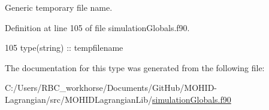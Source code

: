 Generic temporary file name. 



Definition at line 105 of file simulation\+Globals.\+f90.


\begin{DoxyCode}
105         \textcolor{keywordtype}{type}(string) :: tempfilename
\end{DoxyCode}


The documentation for this type was generated from the following file\+:\begin{DoxyCompactItemize}
\item 
C\+:/\+Users/\+R\+B\+C\+\_\+workhorse/\+Documents/\+Git\+Hub/\+M\+O\+H\+I\+D-\/\+Lagrangian/src/\+M\+O\+H\+I\+D\+Lagrangian\+Lib/\mbox{\hyperlink{simulation_globals_8f90}{simulation\+Globals.\+f90}}\end{DoxyCompactItemize}
